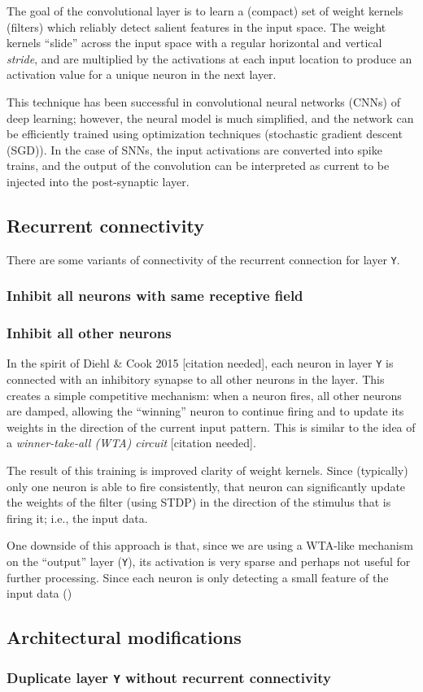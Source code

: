 \documentclass{article}
\begin{document}
The goal of the convolutional layer is to learn a (compact) set of weight kernels (filters) which reliably detect salient features in the input space. The weight kernels ``slide'' across the input space with a regular horizontal and vertical \textit{stride}, and are multiplied by the activations at each input location to produce an activation value for a unique neuron in the next layer.

This technique has been successful in convolutional neural networks (CNNs) of deep learning; however, the neural model is much simplified, and the network can be efficiently trained using optimization techniques (stochastic gradient descent (SGD)). In the case of SNNs, the input activations are converted into spike trains, and the output of the convolution can be interpreted as current to be injected into the post-synaptic layer. 

\subsection{Recurrent connectivity}

There are some variants of connectivity of the recurrent connection for layer \texttt{Y}.

\subsubsection{Inhibit all neurons with same receptive field}

\subsubsection{Inhibit all other neurons}

In the spirit of Diehl \& Cook 2015 [citation needed], each neuron in layer \texttt{Y} is connected with an inhibitory synapse to all other neurons in the layer. This creates a simple competitive mechanism: when a neuron fires, all other neurons are damped, allowing the ``winning'' neuron to continue firing and to update its weights in the direction of the current input pattern. This is similar to the idea of a \textit{winner-take-all (WTA) circuit} [citation needed].

The result of this training is improved clarity of weight kernels. Since (typically) only one neuron is able to fire consistently, that neuron can significantly update the weights of the filter (using STDP) in the direction of the stimulus that is firing it; i.e., the input data.

One downside of this approach is that, since we are using a WTA-like mechanism on the ``output'' layer (\texttt{Y}), its activation is very sparse and perhaps not useful for further processing. Since each neuron is only detecting a small feature of the input data ()

\subsection{Architectural modifications}

\subsubsection{Duplicate layer \texttt{Y} without recurrent connectivity}
\end{document}

